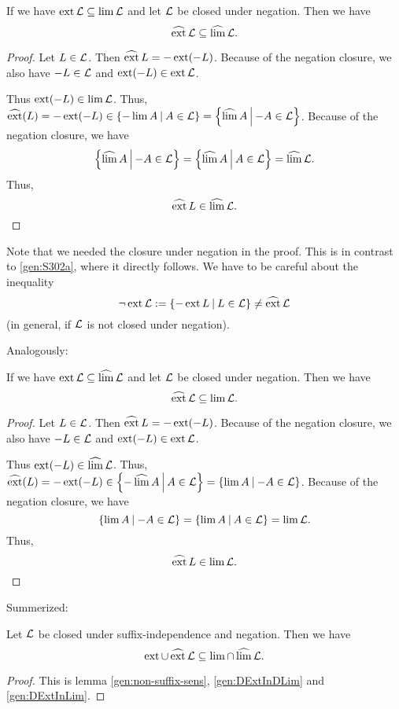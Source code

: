 \begin{lemma}
\label{gen:DExtInDLim}
If we have $\operatorname{ext} \mathcal{L} \subseteq \lim \mathcal{L}$ and let $\mathcal{L}$ be closed under negation. Then we have
\[ \operatorname{\widehat{ext}} \mathcal{L} \subseteq \operatorname{\widehat{lim}} \mathcal{L} . \]
\begin{proof}
Let $L \in \mathcal{L}$. Then $ \operatorname{\widehat{ext}} L = - \operatorname{ext} (-L) $. Because of the negation closure, we also have $-L \in \mathcal{L}$ and $\operatorname{ext}(-L) \in \operatorname{ext} \mathcal{L}$.

Thus $\operatorname{ext}(-L) \in \lim \mathcal{L}$. Thus, $\dext(L) = -\ext(-L) \in \Set{-\lim A}{A \in \Lang} = \Set{\dlim A}{-A \in \Lang}$. Because of the negation closure, we have
\[ \Set{\dlim A}{-A \in \Lang} = \Set{\dlim A}{A \in \Lang} = \dlim \Lang . \]
Thus,
\[ \operatorname{\widehat{ext}} L \in \operatorname{\widehat{lim}} \mathcal{L} . \]
\end{proof}
\end{lemma}

Note that we needed the closure under negation in the proof. This is in contrast to \cref{gen:S302a}, where it directly follows. We have to be careful about the inequality
\[ \neg\ext \Lang := \Set{-\ext L}{L \in \Lang} \neq \dext \Lang \]
(in general, if $\mathcal{L}$ is not closed under negation).

Analogously:

\begin{lemma}
\label{gen:DExtInLim}
If we have $\operatorname{ext} \mathcal{L} \subseteq \operatorname{\widehat{lim}} \mathcal{L}$ and let $\mathcal{L}$ be closed under negation. Then we have
\[ \operatorname{\widehat{ext}} \mathcal{L} \subseteq \lim \mathcal{L} . \]
\begin{proof}
Let $L \in \mathcal{L}$. Then $ \operatorname{\widehat{ext}} L = - \operatorname{ext} (-L) $. Because of the negation closure, we also have $-L \in \mathcal{L}$ and $\operatorname{ext}(-L) \in \operatorname{ext} \mathcal{L}$.

Thus $\operatorname{ext}(-L) \in \operatorname{\widehat{lim}} \mathcal{L}$. Thus, $\dext(L) = -\ext(-L) \in \Set{-\dlim A}{A \in \Lang} = \Set{\lim A}{-A \in \Lang}$. Because of the negation closure, we have
\[ \Set{\lim A}{-A \in \Lang} = \Set{\lim A}{A \in \Lang} = \lim \Lang . \]
Thus,
\[ \operatorname{\widehat{ext}} L \in \lim \mathcal{L} . \]
\end{proof}
\end{lemma}

Summerized:

\begin{lemma}
\label{gen:extInLim}
Let $\mathcal{L}$ be closed under suffix-independence and negation. Then we have
\[ \operatorname{ext} \cup \operatorname{\widehat{ext}} \mathcal{L} \subseteq \lim \cap \operatorname{\widehat{lim}} \mathcal{L} . \]
\begin{proof}
This is lemma \ref{gen:non-suffix-sens}, \ref{gen:DExtInDLim} and \ref{gen:DExtInLim}.
\end{proof}
\end{lemma}

